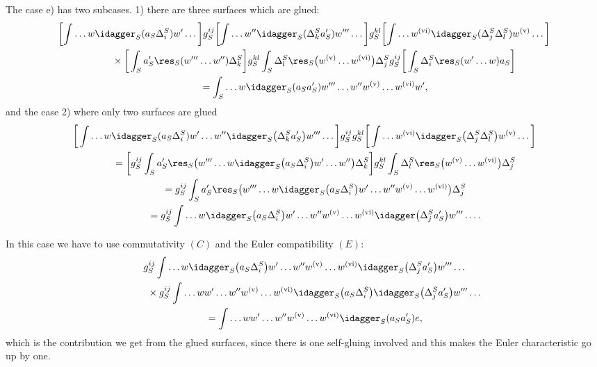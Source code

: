 The case e) has two subcases. 1) there are three surfaces which are
glued:
\begin{gather*}
\bigg[\!\int \dots w  \idagger_{S}(a_S \Delta^{S}_{i}) w'\dots \bigg]
g^{ij}_{S}
\bigg[\!\int \dots w''  \idagger_{S}( \Delta^{S}_{k} a'_S) w'''\dots \bigg] g^{kl}_{S}
\bigg[\!\int  \dots w^{\rm (vi)} \idagger_{S}( \Delta_j^{S} \Delta_l^{S}) w^{\rm (v)} \dots \bigg]   \\
\qquad{}\times\bigg[ \int_S a'_S\res_S( w'''\dots w'' )\Delta^{S}_{k} \bigg ] g^{kl}_{S}
\int _S  \Delta_l^S \res_S\big(w^{\rm (v)} \dots w^{\rm (vi)}\big)\Delta_j^{S}
  g^{ij}_{S}\bigg[\int_S  \Delta^{S}_{i}\res_S( w' \dots w)a_S\bigg]   \\
\qquad{} = \int_S \dots w\idagger_S(a_Sa'_S) w'''\dots w'' w^{\rm (v)} \dots w^{\rm (vi)} w',
\end{gather*}
and the case 2) where only two surfaces are glued %
\begin{gather*}
\bigg[\int \dots w  \idagger_{S}(a_S \Delta^{S}_{i}) w' \dots w''
\idagger_{S}\big( \Delta^{S}_{k} a'_S\big) w'''\dots \bigg] g^{ij}_{S}
g^{kl}_{S} \bigg[\int  \dots w^{\rm (vi)} \idagger_{S}\big( \Delta_j^{S} \Delta_l^{S}\big) w^{\rm (v)} \dots \bigg]   \\
\qquad{} =\bigg[
 g^{ij}_{S} \int_S a'_S\res_S\big( w'''\dots w  \idagger_{S}\big(a_S \Delta^{S}_{i}\big) w' \dots w'' \big)\Delta^{S}_{k}  \bigg] g^{kl}_{S}
 \int _S \Delta_l^S \res_S\big(w^{\rm (v)} \dots w^{\rm (vi)} \big) \Delta_j^{S}
 \\
\qquad{} = g^{ij}_{S} \int_S a'_S\res_S\big( w'''\dots w  \idagger_{S}\big(a_S \Delta^{S}_{i}\big) w' \dots w'' w^{\rm (v)} \dots w^{\rm (vi)} \big) \Delta_j^{S} \\
\qquad{}=  g^{ij}_{S}\int  \dots w  \idagger_{S}\big(a_S \Delta^{S}_{i}\big) w' \dots w'' w^{\rm (v)} \dots w^{\rm (vi)} \idagger\big(\Delta_j^S a_S'\big)w''' \dots.
\end{gather*}

In this case we have to use commutativity $(C)$ and
the Euler compatibility $(E)$:
\begin{gather*}
  g^{ij}_{S}\int  \dots w  \idagger_{S}\big(a_S \Delta^{S}_{i}\big) w' \dots w'' w^{\rm (v)} \dots w^{\rm (vi)} \idagger_S\big(\Delta_j^S a_S'\big)w''' \dots \\
\qquad {}\times g^{ij}_{S}\int  \dots w   w' \dots w'' w^{\rm (v)} \dots w^{\rm (vi)}\idagger_{S}\big(a_S \Delta^{S}_{i}\big) \idagger_S\big(\Delta_j^S a_S'\big)w''' \dots \\
\qquad{} =\int \dots w  w' \dots w'' w^{\rm (v)} \dots w^{\rm (vi)} \idagger_S(a_Sa'_S) e,
\end{gather*}
which is the contribution we get from the glued surfaces, since there is one self-gluing involved  and
this makes the Euler characteristic go up by one.


